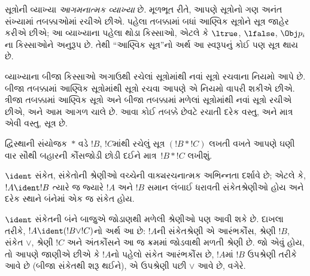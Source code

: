 \begin{explain}
સૂત્રોની વ્યાખ્યા \emph{આગમનાત્મક વ્યાખ્યા} છે. મૂળભૂત રીતે,
આપણે સૂત્રોનો ગણ અનંત સંખ્યામાં તબક્કાઓમાં રચીએ છીએ. પહેલા
તબક્કામાં બધાં આણ્વિક સૂત્રોને સૂત્ર જાહેર કરીએ છીએ; આ વ્યાખ્યાના
પહેલા થોડા કિસ્સાઓ, એટલે કે
$\ltrue$, %
$\lfalse$, %
$\Obj p_i$ના કિસ્સાઓને અનુરૂપ છે. તેથી ``આણ્વિક સૂત્ર''નો અર્થ
આ સ્વરૂપનું કોઈ પણ સૂત્ર થાય છે.

વ્યાખ્યાના બીજા કિસ્સાઓ અગાઉથી રચેલાં સૂત્રોમાંથી નવાં
સૂત્રો રચવાના નિયમો આપે છે. બીજા તબક્કામાં આણ્વિક
સૂત્રોમાંથી સૂત્રો રચવા આપણે એ નિયમો વાપરી શકીએ છીએ.
ત્રીજા તબક્કામાં આણ્વિક સૂત્રો અને બીજા તબક્કામાં મળેલાં સૂત્રોમાંથી
નવાં સૂત્રો રચીએ છીએ, અને આમ આગળ ચાલે છે. આવા કોઈ તબક્કે છેવટે
રચાતી દરેક વસ્તુ, અને માત્ર એવી વસ્તુ, સૂત્ર છે.
\end{explain}

દ્વિસ્થાની સંયોજક~$\ast$ વડે $!B$, $!C$માંથી રચેલું સૂત્ર
$(!B \ast !C)$ લખતી વખતે આપણે ઘણી વાર સૌથી બહારની કૌંસજોડી છોડી
દઈને માત્ર~$!B \ast !C$ લખીશું.



\begin{defn}[વાક્યરચનાત્મક અભિન્નતા]
$\ident$ સંકેત, સંકેતોની શ્રેણીઓ વચ્ચેની વાક્યરચનાત્મક અભિન્નતા
દર્શાવે છે; એટલે કે, $!A \ident !B$ ત્યારે જ જ્યારે $!A$ અને $!B$
સમાન લંબાઈ ધરાવતી સંકેતશ્રેણીઓ હોય અને દરેક સ્થાને બંનેમાં એક જ
સંકેત હોય.
\end{defn}

$\ident$ સંકેતની બંને બાજુએ જોડાણથી મળેલી શ્રેણીઓ પણ આવી શકે છે.
દાખલા તરીકે, $!A \ident (!B \lor !C)$નો અર્થ આ છે: $!A$ની
સંકેતશ્રેણી એ આરંભકૌંસ, શ્રેણી $!B$, સંકેત $\lor$, શ્રેણી $!C$ અને
અંતકૌંસને આ જ ક્રમમાં જોડવાથી મળતી શ્રેણી છે. જો એવું હોય, તો આપણે
જાણીએ છીએ કે $!A$નો પહેલો સંકેત આરંભકૌંસ છે, $!A$માં $!B$ ઉપશ્રેણી
તરીકે આવે છે (બીજા સંકેતથી શરૂ થઈને), એ ઉપશ્રેણી પછી $\lor$ આવે છે,
વગેરે.
\endgroup


\begingroup
\makeatletter{}\makeatother


\label{guunit:OLP-0059}


